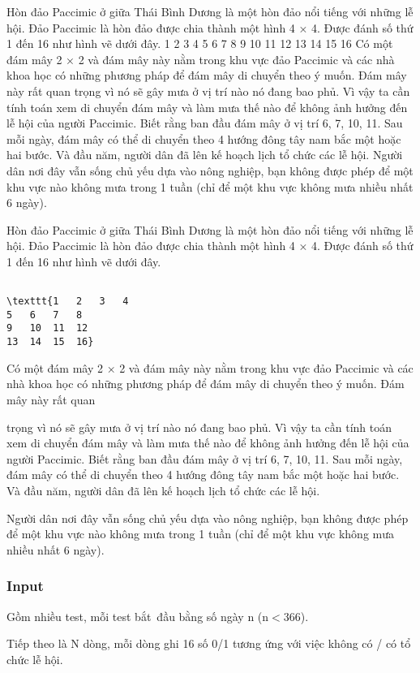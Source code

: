 

Hòn đảo Paccimic ở giữa Thái Bình Dương là một hòn đảo nổi tiếng với những lễ hội. Đảo Paccimic là hòn đảo được chia thành một hình 4 × 4. Được đánh số thứ 1 đến 16 như hình vẽ dưới đây. 1 2 3 4 5 6 7 8 9 10 11 12 13 14 15 16 Có một đám mây 2 × 2 và đám mây này nằm trong khu vực đảo Paccimic và các nhà khoa học có những phương pháp để đám mây di chuyển theo ý muốn. Đám mây này rất quan trọng vì nó sẽ gây mưa ở vị trí nào nó đang bao phủ. Vì vậy ta cần tính toán xem di chuyển đám mây và làm mưa thế nào để không ảnh hưởng đến lễ hội của người Paccimic. Biết rằng ban đầu đám mây ở vị trí 6, 7, 10, 11. Sau mỗi ngày, đám mây có thể di chuyển theo 4 hướng đông tây nam bắc một hoặc hai bước. Và đầu năm, người dân đã lên kế hoạch lịch tổ chức các lễ hội. Người dân nơi đây vẫn sống chủ yếu dựa vào nông nghiệp, bạn không được phép để một khu vực nào không mưa trong 1 tuần (chỉ để một khu vực không mưa nhiều nhất 6 ngày).

Hòn đảo Paccimic ở giữa Thái Bình Dương là một hòn đảo nổi tiếng với những lễ hội. Đảo Paccimic là hòn đảo được chia thành một hình 4 × 4. Được đánh số thứ 1 đến 16 như hình vẽ dưới đây.
\begin{verbatim}

\texttt{1	2	3	4
5	6	7	8
9	10	11	12
13	14	15	16}\end{verbatim}

Có một đám mây 2 × 2 và đám mây này nằm trong khu vực đảo Paccimic và các nhà khoa học có những phương pháp để đám mây di chuyển theo ý muốn. Đám mây này rất quan

trọng vì nó sẽ gây mưa ở vị trí nào nó đang bao phủ. Vì vậy ta cần tính toán xem di chuyển đám mây và làm mưa thế nào để không ảnh hưởng đến lễ hội của người Paccimic. Biết rằng ban đầu đám mây ở vị trí 6, 7, 10, 11. Sau mỗi ngày, đám mây có thể di chuyển theo 4 hướng đông tây nam bắc một hoặc hai bước. Và đầu năm, người dân đã lên kế hoạch lịch tổ chức các lễ hội.

Người dân nơi đây vẫn sống chủ yếu dựa vào nông nghiệp, bạn không được phép để một khu vực nào không mưa trong 1 tuần (chỉ để một khu vực không mưa nhiều nhất 6 ngày).

\subsubsection{Input}

Gồm nhiều test, mỗi test bắt đầu bằng số ngày n (n$<$366).

Tiếp theo là N dòng, mỗi dòng ghi 16 số 0/1 tương ứng với việc không có / có tổ chức lễ hội.

